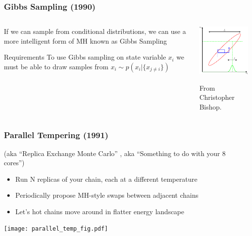 \documentclass[compress]{beamer}
\begin{document}
\begin{frame}
  \frametitle{Gibbs Sampling (1990) }
  \begin{columns}
    \begin{column}{5cm}
      If we can sample from conditional distributions, we can 
      use a more intelligent form of MH known as Gibbs Sampling  \cite{Geman_Stochastic_1990}
      \pause
      \begin{alertblock}{Requirements}
        To use Gibbs sampling on state variable $x_i$ we must be able
        to draw samples from $x_i \sim p(x_i | \{x_{j \neq i}\})$
      \end{alertblock}
    \end{column}
    
    \begin{column}{5cm}
      \includegraphics[width=5cm]{notmine/Bishop_Figure11-11}

      From Christopher Bishop. 
    \end{column}
  \end{columns}

\end{frame}


\begin{frame}
  \frametitle{Parallel Tempering (1991) } 
  (aka ``Replica Exchange Monte Carlo'' \cite{Swendsen_Replica_1986}, aka ``Something to do with your 8 cores'')
  \begin{itemize}
  \item Run N replicas of your chain, each at a different temperature
  \item Periodically propose MH-style swaps between adjacent chains
  \item Let's hot chains move around in flatter energy landscape
  \end{itemize}
  \begin{centering}
  \texttt{[image: parallel\_temp\_fig.pdf]}
  \end{centering}
\end{frame}
\end{document}
